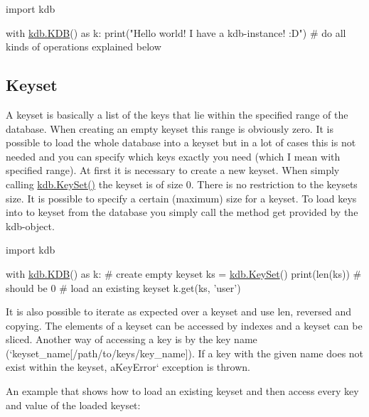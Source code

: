 \begin{DoxyCode}
\textcolor{keyword}{import} kdb

with \hyperlink{classkdb_1_1KDB}{kdb.KDB}() \textcolor{keyword}{as} k:
    print(\textcolor{stringliteral}{"Hello world! I have a kdb-instance! :D"})
    \textcolor{comment}{# do all kinds of operations explained below}
\end{DoxyCode}


\subsection*{Keyset}

A keyset is basically a list of the keys that lie within the specified range of the database. When creating an empty keyset this range is obviously zero. It is possible to load the whole database into a keyset but in a lot of cases this is not needed and you can specify which keys exactly you need (which I mean with specified range). At first it is necessary to create a new keyset. When simply calling {\ttfamily \hyperlink{classkdb_1_1KeySet}{kdb.\+Key\+Set()}} the keyset is of size 0. There is no restriction to the keyset\textquotesingle{}s size. It is possible to specify a certain (maximum) size for a keyset. To load keys into to keyset from the database you simply call the method {\ttfamily get} provided by the kdb-\/object.


\begin{DoxyCode}
\textcolor{keyword}{import} kdb

with \hyperlink{classkdb_1_1KDB}{kdb.KDB}() \textcolor{keyword}{as} k:
    \textcolor{comment}{# create empty keyset}
    ks = \hyperlink{classkdb_1_1KeySet}{kdb.KeySet}()
    print(len(ks))  \textcolor{comment}{# should be 0}
    \textcolor{comment}{# load an existing keyset}
    k.get(ks, \textcolor{stringliteral}{'user'})
\end{DoxyCode}


It is also possible to iterate as expected over a keyset and use {\ttfamily len}, {\ttfamily reversed} and copying. The elements of a keyset can be accessed by indexes and a keyset can be sliced. Another way of accessing a key is by the key name (`keyset\+\_\+name\mbox{[}\textquotesingle{}/path/to/keys/key\+\_\+name\textquotesingle{}\mbox{]}{\ttfamily ). If a key with the given name does not exist within the keyset, a}Key\+Error` exception is thrown.

An example that shows how to load an existing keyset and then access every key and value of the loaded keyset\+:


